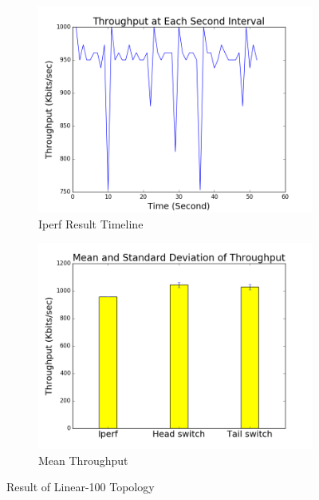 \documentclass[12pt]{article}
\begin{document}
\begin{figure}
\centering
\begin{subfigure}{.5\textwidth}
  \centering
  \includegraphics[width=.9\linewidth]{544_data/544_linear_100/timeline.png}
  \caption{Iperf Result Timeline}
  \label{fig:second_a}
\end{subfigure}%
\begin{subfigure}{.5\textwidth}
  \centering
  \includegraphics[width=.9\linewidth]{544_data/544_linear_100/bar.png}
  \caption{Mean Throughput}
  \label{fig:second_b}
\end{subfigure}
\caption{Result of Linear-100 Topology}
\label{fig:second}
\end{figure}
\end{document}
